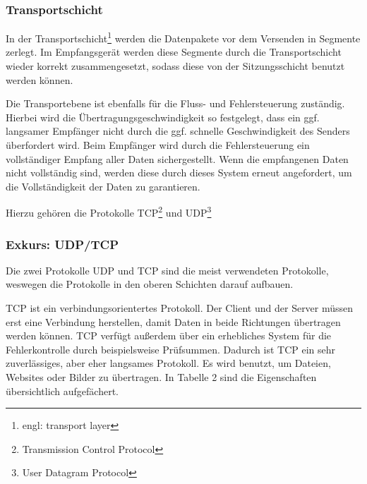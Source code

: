 \documentclass[12pt]{article}
\begin{document}
\subsubsection{Transportschicht}
	In der Transportschicht\footnote{engl: transport layer} werden die Datenpakete vor dem Versenden in Segmente zerlegt. Im Empfangsgerät werden diese Segmente durch die Transportschicht wieder korrekt zusammengesetzt, sodass diese von der Sitzungsschicht benutzt werden können. 
	
	Die Transportebene ist ebenfalls für die Fluss- und Fehlersteuerung zuständig. Hierbei wird die Übertragungsgeschwindigkeit so festgelegt, dass ein ggf. langsamer Empfänger nicht durch die ggf. schnelle Geschwindigkeit des Senders überfordert wird. Beim Empfänger wird durch die Fehlersteuerung ein vollständiger Empfang aller Daten sichergestellt. Wenn die empfangenen Daten nicht vollständig sind, werden diese durch dieses System erneut angefordert, um die Vollständigkeit der Daten zu garantieren. 
	
	Hierzu gehören die Protokolle TCP\footnote{Transmission Control Protocol} und UDP\footnote{User Datagram Protocol}\cite{osi-schichten-cloudflare}\cite{osi-schichten-netzwerkecom}

\subsubsection{Exkurs: UDP/TCP}

Die zwei Protokolle UDP und TCP sind die meist verwendeten Protokolle, weswegen die Protokolle in den oberen Schichten darauf aufbauen. 

TCP ist ein verbindungsorientertes Protokoll. Der Client und der Server müssen erst eine Verbindung herstellen, damit Daten in beide Richtungen übertragen werden können. TCP verfügt außerdem über ein erhebliches System für die Fehlerkontrolle durch beispielsweise Prüfsummen.\cite{tcp+ip-netzwerkecom} Dadurch ist TCP ein sehr zuverlässiges, aber eher langsames Protokoll. Es wird benutzt, um Dateien, Websites oder Bilder zu übertragen.\cite{tcp} In Tabelle 2 sind die Eigenschaften übersichtlich aufgefächert.
\end{document}
